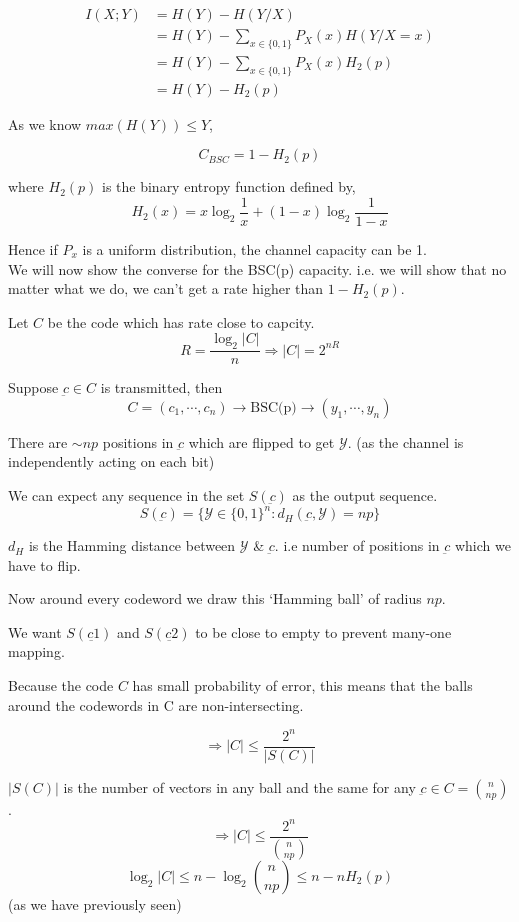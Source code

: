 \documentclass{article}
\begin{document}
\begin{align*}
    I(X;Y) &= H(Y) -H(Y/X) \\
    &= H(Y)- \sum_{x \in \{ 0, 1 \}} P_X(x) H(Y/X=x) \\
    &= H(Y)- \sum_{x \in \{ 0, 1 \}} P_X(x) H_2(p) \\
    &= H(Y) - H_2 (p)
\end{align*}

As we know $max(H(Y)) \leq Y$,

$$ C_{BSC} = 1- H_2(p)$$

where $H_2(p)$ is the binary entropy function defined by,
$$ H_2(x)= x \log_2 \frac{1}{x} + (1-x) \log_2 \frac{1}{1-x}$$

Hence if $P_x$ is a uniform distribution, the channel capacity can be 1.\\

We will now show the converse for the BSC(p) capacity. i.e. we will show that no matter what we do, we can't get a rate higher than $1- H_2 (p)$.

Let $C$ be the code which has rate close to capcity.
$$ R= \frac{ \log_2 |C|}{n} \Rightarrow |C| = 2^{nR}$$

Suppose $\underbar{c} \in C $ is transmitted, then
$$ C = (c_1, \cdots , c_n) \to \text{BSC(p)} \to (y_1, \cdots , y_n)$$

There are $\sim np$ positions in $\underbar{c}$ which are flipped to get $\mathcal{Y}$. (as the channel is independently acting on each bit)

We can expect any sequence in the set $S(\underbar{c})$ as the output sequence.
$$ S(\underbar{c})= \{ \mathcal{Y} \in \{0,1 \}^n : d_H (\underbar{c}, \mathcal{Y})= np\}$$

$d_H$ is the Hamming distance between $\mathcal{Y}$ \& $\underbar{c}$. i.e number of positions in $\underbar{c}$ which we have to flip.

Now around every codeword we draw this `Hamming ball' of radius $np$.

We want $S(\underbar{c1})$ and $S(\underbar{c2})$ to be close to empty to prevent many-one mapping.

Because the code $C$ has small probability of error, this means that the balls around the codewords in C are non-intersecting.

$$ \Rightarrow |C| \leq \frac{2^n}{|S(C)|}$$

$|S(C)|$ is the number of vectors in any ball and the same for any $\underbar{c} \in C = {n \choose np}$.
$$ \Rightarrow |C| \leq \frac{2^n}{{n \choose np}}$$
$$ \log_2 |C| \leq n- \log_2 {n \choose np} \leq n - n H_2 (p)$$
(as we have previously seen)
\end{document}
